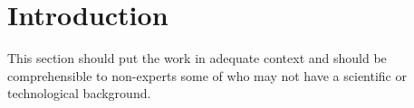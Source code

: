 \section{Introduction}

This section should put the work in adequate context and should be comprehensible to non-experts some of who may not have a scientific or technological background.